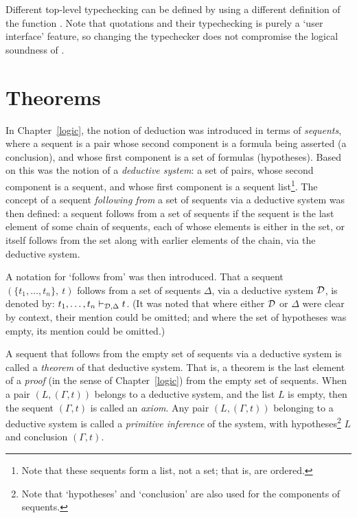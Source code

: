 {\noindent Different top-level typechecking can be defined by using a
different definition of the function
. Note that quotations and their typechecking
is purely a `user interface' feature, so changing the typechecker does
not compromise the logical soundness of \HOL.



\section{Theorems}
\label{avra_theorems}

In Chapter~\ref{logic}, the notion of deduction was introduced in terms
of {\it sequents\/}, where a sequent
is a pair whose second component is a formula being
asserted (a conclusion), 
and whose first component is a set of formulas (hypotheses).
Based on this was the notion of a {\it deductive system\/}: a set of pairs,
whose second component is a sequent, and
whose first component is a sequent list\footnote{Note that these sequents
form a list, not a set; that is, are ordered.}.
The concept of a sequent {\it following from\/}
a set of sequents via a
deductive system was then defined: a sequent follows from a set of sequents if
the sequent
is the last element of some chain of sequents, each of whose
elements is either in the set, or itself follows from the set along with
earlier elements of the chain, via the deductive system.

A notation for `follows from' was then introduced.
That a
sequent $(\{t_1,\ldots,t_n\},\ t)$ follows from
a set of sequents $\Delta$, via a deductive system ${\cal D}$, is
denoted by: $t_1,\ldots,t_n\vdash_{{\cal D},\Delta} t$.
(It was noted that
where either ${\cal D}$ or $\Delta$ were clear by context, their mention
could be omitted; and where the set of hypotheses was empty,
its mention could be omitted.)

A sequent that follows from the empty set of sequents via
a deductive system is called a {\it theorem\/} of that deductive system.
That is, a theorem is the last element of a {\it proof\/} (in the sense
of Chapter~\ref{logic}) from the empty
set of sequents. When a pair $(L,(\Gamma,t))$ belongs to a deductive system,
and the list $L$ is empty, 
then the sequent $(\Gamma,t)$ is called an {\it axiom\/}. 
Any pair $(L,(\Gamma,t))$ belonging to 
a deductive system is called a {\it primitive inference\/}
of the system, with hypotheses\footnote{Note that
`hypotheses' and `conclusion' are also used for the components
of sequents.} $L$ and 
conclusion $(\Gamma,t)$.

}

